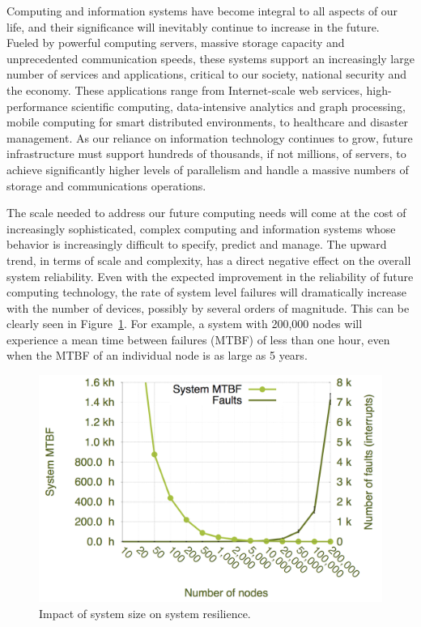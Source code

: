 Computing and information systems have become integral to all aspects of our life, and their significance will inevitably continue to increase in the future. Fueled by powerful computing servers, massive storage capacity and unprecedented communication speeds, these systems support an increasingly large number of services and applications, critical to our society, national security and the economy. These applications range from Internet-scale web services, high-performance scientific computing, data-intensive analytics and graph processing, mobile computing for smart distributed environments, to healthcare and disaster management. As our reliance on information technology continues to grow, future infrastructure must support hundreds of thousands, if not millions, of servers, to achieve significantly higher levels of parallelism and handle a massive numbers of storage and communications operations.

The scale needed to address our future computing needs will come at the cost of increasingly sophisticated, complex computing and information systems whose behavior is increasingly difficult to specify, predict and manage.
The upward trend, in terms of scale and complexity, has a direct negative effect on the overall system reliability. 
Even with the expected improvement in the reliability of future computing technology, the rate of system level failures will dramatically increase with the number of devices, possibly by several orders of magnitude. This can be clearly seen in Figure~\ref{fig:exe_failure}. For example, a system with 200,000 nodes will experience a mean time between failures (MTBF) of less than one hour, even when the MTBF of an individual node is as large as 5 years. 

\begin{figure}[!t]
	\begin{center}
		\includegraphics[width=0.9\columnwidth]{Figures/sandia_system_failure_rate_increase_nodes}
	\end{center}
	\vskip -0.25in 
	\caption{Impact of system size on system resilience.}
	\label{fig:exe_failure}
\end{figure}


